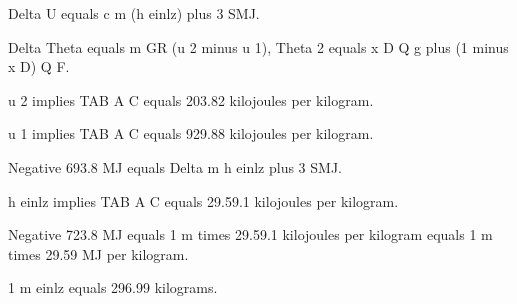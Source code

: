 Delta U equals c m (h einlz) plus 3 SMJ.

Delta Theta equals m GR (u 2 minus u 1), Theta 2 equals x D Q g plus (1 minus x D) Q F.

u 2 implies TAB A C equals 203.82 kilojoules per kilogram.

u 1 implies TAB A C equals 929.88 kilojoules per kilogram.

Negative 693.8 MJ equals Delta m h einlz plus 3 SMJ.

h einlz implies TAB A C equals 29.59.1 kilojoules per kilogram.

Negative 723.8 MJ equals 1 m times 29.59.1 kilojoules per kilogram equals 1 m times 29.59 MJ per kilogram.

1 m einlz equals 296.99 kilograms.